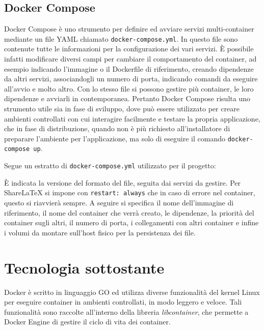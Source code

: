 \subsection{Docker Compose}
Docker Compose è uno strumento per definire ed avviare servizi multi-container mediante un file YAML chiamato \verb|docker-compose.yml|. In questo file sono contenute tutte le informazioni per la configurazione dei vari servizi. È possibile infatti modificare diversi campi per cambiare il comportamento del container, ad esempio indicando l'immagine o il Dockerfile di riferimento, creando dipendenze da altri servizi, associandogli un numero di porta, indicando comandi da eseguire all'avvio e molto altro. Con lo stesso file si possono gestire più container, le loro dipendenze e avviarli in contemporanea. Pertanto Docker Compose risulta uno strumento utile sia in fase di sviluppo, dove può essere utilizzato per creare ambienti controllati con cui interagire facilmente e testare la propria applicazione, che in fase di distribuzione, quando non è più richiesto all'installatore di preparare l'ambiente per l'applicazione, ma solo di eseguire il comando \verb|docker-compose up|.

Segue un estratto di \verb|docker-compose.yml| utilizzato per il progetto:

È indicata la versione del formato del file, seguita dai servizi da gestire. Per ShareLaTeX si impone con \verb|restart: always| che in caso di errore nel container, questo si riavvierà sempre. A seguire si specifica il nome dell'immagine di riferimento, il nome del container che verrà creato, le dipendenze, la priorità del container sugli altri, il numero di porta, i collegamenti con altri container e infine i volumi da montare sull'host fisico per la persistenza dei file.
 
\section{Tecnologia sottostante}
Docker è scritto in linguaggio GO ed utilizza diverse funzionalità del kernel Linux per eseguire container in ambienti controllati, in modo leggero e veloce. Tali funzionalità sono raccolte all'interno della libreria \emph{libcontainer}, che permette a Docker Engine di gestire il ciclo di vita dei container.

